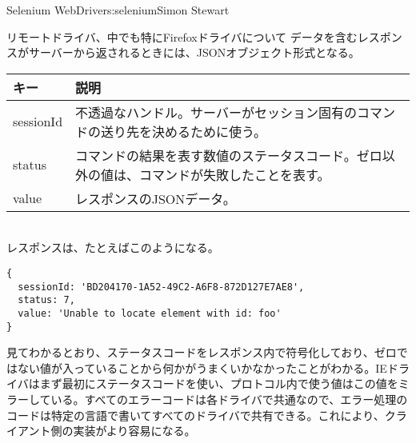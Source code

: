 \begin{aosachapter}{Selenium WebDriver}{s:selenium}{Simon Stewart}
\begin{aosasect1}{リモートドライバ、中でも特にFirefoxドライバについて}
データを含むレスポンスがサーバーから返されるときには、JSONオブジェクト形式となる。

\begin{tabular}{|lp{4in}|}
\hline
キー & 説明 \\
\hline
sessionId & 不透過なハンドル。サーバーがセッション固有のコマンドの送り先を決めるために使う。\\
status & コマンドの結果を表す数値のステータスコード。ゼロ以外の値は、コマンドが失敗したことを表す。\\
value & レスポンスのJSONデータ。\\
\hline
\end{tabular}

~\\

\noindent
レスポンスは、たとえばこのようになる。

\begin{verbatim}
{
  sessionId: 'BD204170-1A52-49C2-A6F8-872D127E7AE8',
  status: 7,
  value: 'Unable to locate element with id: foo'
}
\end{verbatim}

\noindent 見てわかるとおり、ステータスコードをレスポンス内で符号化しており、ゼロではない値が入っていることから何かがうまくいかなかったことがわかる。IEドライバはまず最初にステータスコードを使い、プロトコル内で使う値はこの値をミラーしている。すべてのエラーコードは各ドライバで共通なので、エラー処理のコードは特定の言語で書いてすべてのドライバで共有できる。これにより、クライアント側の実装がより容易になる。


\end{aosasect1}
\end{aosachapter}
